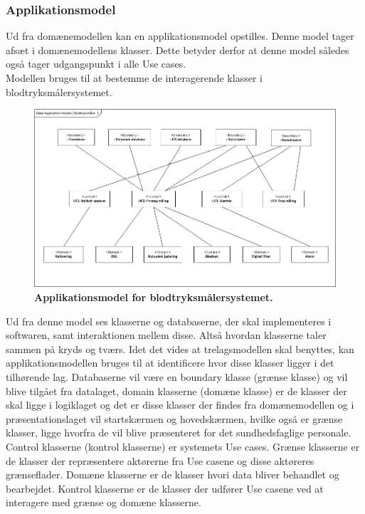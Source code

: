 \subsubsection{Applikationsmodel}
Ud fra domænemodellen kan en applikationsmodel opstilles. Denne model tager afsæt i domænemodellens klasser. Dette betyder derfor at denne model således også tager udgangspunkt i alle Use cases.\\
Modellen bruges til at bestemme de interagerende klasser i blodtryksmålersystemet.\\
\begin{figure}[H]
\includegraphics[width =1.0\textwidth , center]{billeder/appModel}
\caption{\textbf{Applikationsmodel for blodtryksmålersystemet.}}
\end{figure}
Ud fra denne model ses klasserne og databaserne, der skal implementeres i softwaren, samt interaktionen mellem disse. Altså hvordan klasserne taler sammen på kryds og tværs. Idet det vides at trelagsmodellen skal benyttes, kan applikationsmodellen bruges til at identificere hvor disse klasser ligger i det tilhørende lag. Databaserne vil være en boundary klasse (grænse klasse) og vil blive tilgået fra datalaget, domain klasserne (domæne klasse) er de klasser der skal ligge i logiklaget og det er disse klasser der findes fra domænemodellen og i præsentationslaget vil startskærmen og hovedskærmen, hvilke også er grænse klasser, ligge hvorfra de vil blive præsenteret for det sundhedsfaglige personale. Control klasserne (kontrol klasserne) er systemets Use cases. Grænse klasserne er de klasser der repræsentere aktørerne fra Use casene og disse aktøreres grænseflader. Domæne klasserne er de klasser hvori data bliver behandlet og bearbejdet. Kontrol klasserne er de klasser der udfører Use casene ved at interagere med grænse og domæne klasserne. \\\\
